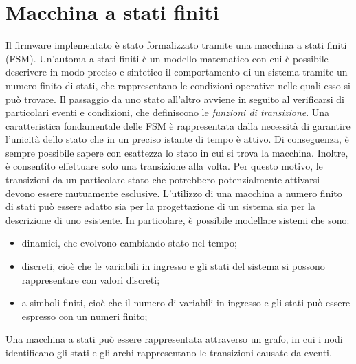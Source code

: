 \section{Macchina a stati finiti} \label{cap:FSM}
Il firmware implementato è stato formalizzato tramite una macchina a stati finiti (FSM). Un'automa a stati finiti è un modello matematico con cui è possibile descrivere in modo preciso e sintetico il comportamento di un sistema tramite un numero finito di stati, che rappresentano le condizioni operative nelle quali esso si può trovare. Il passaggio da uno stato all'altro avviene in seguito al verificarsi di particolari eventi e condizioni, che definiscono le \textit{funzioni di transizione}. Una caratteristica fondamentale delle FSM è rappresentata dalla necessità di garantire l'unicità dello stato che in un preciso istante di tempo è attivo. Di conseguenza, è sempre possibile sapere con esattezza lo stato in cui si trova la macchina. Inoltre, è consentito effettuare solo una transizione alla volta. Per questo motivo, le transizioni da un particolare stato che potrebbero potenzialmente attivarsi devono essere mutuamente esclusive.
L'utilizzo di una macchina a numero finito di stati può essere adatto sia per la progettazione di un sistema sia per la descrizione di uno esistente. In particolare, è possibile modellare sistemi che sono:
\begin{itemize}
	\item dinamici, che evolvono cambiando stato nel tempo;
	\item discreti, cioè che le variabili in ingresso e gli stati del sistema si possono rappresentare con valori discreti;
	\item a simboli finiti, cioè che il numero di variabili in ingresso e gli stati può essere espresso con un numeri finito;
\end{itemize}
Una macchina a stati può essere rappresentata attraverso un grafo, in cui i nodi identificano gli stati e gli archi rappresentano le transizioni causate da eventi. 

